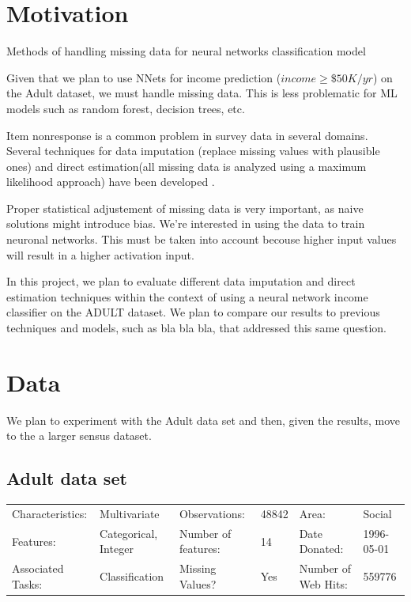 \documentclass[12pt]{article}
\begin{document}
\maketitle

\section{Motivation}

Methods of handling missing data for neural networks classification model

Given that we plan to use NNets for income prediction ($income \geq \$ 50K/yr$) on the Adult dataset, we must handle missing data. This is less problematic for ML models such as random forest, decision trees, etc.


Item nonresponse is a common problem in survey data in several domains. Several techniques for data imputation (replace missing values with plausible ones) and direct estimation(all missing data is analyzed using a maximum likelihood approach) have been developed \cite{de2003prevention}.

Proper statistical adjustement of missing data is very important, as naive solutions might introduce bias. We're interested in using the data to train neuronal networks. This must be taken into account becouse higher input values will result in a higher activation input.

In this project, we plan to evaluate different data imputation and direct estimation techniques within the context of using a neural network income classifier on the ADULT dataset. We plan to compare our results to previous techniques and models, such as bla bla bla, that addressed this same question.

\section{Data}

We plan to experiment with the Adult data set and then, given the results, move to the a larger sensus dataset.
\subsection{Adult data set}

\begin{tabular}{ l l | l l | l l}
  \hline
  Characteristics: & Multivariate &
  Observations: & 48842 &
  Area: & Social \\

  Features: & Categorical, Integer &
  Number of features: & 14 &
  Date Donated: & 1996-05-01 \\

  Associated Tasks: & Classification &
  Missing Values? & Yes &
  Number of Web Hits: & 559776 \\

  \hline
\end{tabular}
\end{document}
